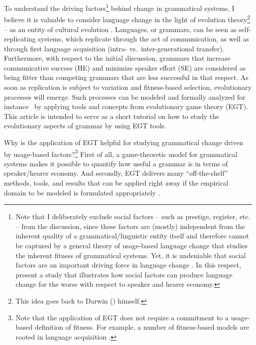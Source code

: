 \documentclass[output=paper,hidelinks]{langscibook}
\begin{document}
To understand the driving factors\footnote{Note that I deliberately exclude social factors -- such as prestige, register, etc. -- from the discussion, since these factors are (mostly) independent from the inherent quality of a grammatical/linguistic entity itself and therefore cannot be captured by a general theory of usage-based language change that studies the inherent fitness of grammatical systems. Yet, it is undeniable that social factors are an important driving force in language change \citep{Labov01}. In this respect, \citet{Roberts_18} present a study that illustrates how social factors can produce language change for the worse with respect to speaker and hearer economy.} behind change in grammatical systems, I believe it is valuable to consider language change in the light of evolution theory\footnote{This idea goes back to Darwin (\citeyear[][Chapter 2]{Darwin1871}) himself.} \citep[cf.][]{Croft2000,rosenbach_08} -- as an entity of cultural evolution \citep[cf.][]{dawkins76,Dennett1995}. Languages, or grammars, can be seen as self-replicating systems, which replicate through the act of communication, as well as through first language acquisition (intra- vs.~inter-generational transfer). Furthermore, with respect to the initial discussion, grammars that increase communicative success (HE) and minimize speaker effort (SE) are considered as being fitter than competing grammars that are less successful in that respect.
As soon as replication is subject to variation and fitness-based selection, evolutionary processes will emerge. 
Such processes can be modeled  and formally analyzed for instance ~by applying tools and concepts from evolutionary game theory (EGT).
This article is intended to serve as a short tutorial on how to study the evolutionary aspects of grammar by using EGT tools. 

Why is the application of EGT helpful for studying grammatical change driven by usage-based factors?\footnote{Note that the application of EGT does not require a commitment to a usage-based definition of fitness. For example, a number of  fitness-based models are rooted in language acquisition \citep[cf.][]{Niyogi_97,Yang_2002}.} First of all, a game-theoretic model for grammatical systems makes it possible to quantify how useful a grammar is in terms of speak\-er/hear\-er economy. And secondly, EGT delivers many ``off-the-shelf'' methods, tools, and results that can be applied right away if the empirical domain to be modeled is formulated appropriately \citep[cf.][]{Jaeger07}.
\end{document}
